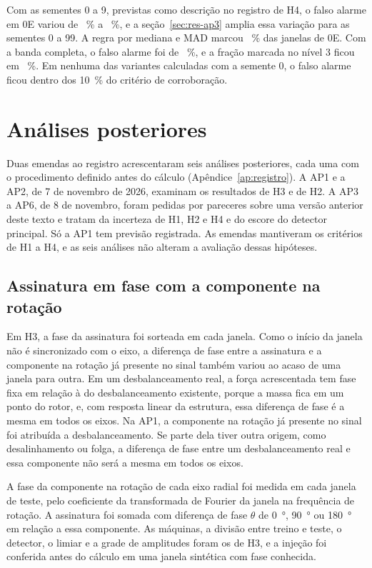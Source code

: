 Com as sementes 0 a 9, previstas como descrição no registro de H4, o falso alarme em 0E variou de \hQuatroFaSementeMin~\% a \hQuatroFaSementeMax~\%, e a seção~\ref{sec:res-ap3} amplia essa variação para as sementes 0 a 99. A regra por mediana e MAD marcou \hQuatroFracaoMadZero~\% das janelas de 0E. Com a banda completa, o falso alarme foi de \hQuatroFracaoBandaCompletaZero~\%, e a fração marcada no nível 3 ficou em \hQuatroFracaoBandaCompletaTres~\%. Em nenhuma das variantes calculadas com a semente 0, o falso alarme ficou dentro dos \SI{10}{\percent} do critério de corroboração.

\section{Análises posteriores}\label{sec:res-posteriores}

Duas emendas ao registro acrescentaram seis análises posteriores, cada uma com o procedimento definido antes do cálculo (Apêndice~\ref{ap:registro}). A AP1 e a AP2, de 7 de novembro de 2026, examinam os resultados de H3 e de H2. A AP3 a AP6, de 8 de novembro, foram pedidas por pareceres sobre uma versão anterior deste texto e tratam da incerteza de H1, H2 e H4 e do escore do detector principal. Só a AP1 tem previsão registrada. As emendas mantiveram os critérios de H1 a H4, e as seis análises não alteram a avaliação dessas hipóteses.

\subsection{Assinatura em fase com a componente na rotação}\label{sec:res-ap1}

Em H3, a fase da assinatura foi sorteada em cada janela. Como o início da janela não é sincronizado com o eixo, a diferença de fase entre a assinatura e a componente na rotação já presente no sinal também variou ao acaso de uma janela para outra. Em um desbalanceamento real, a força acrescentada tem fase fixa em relação à do desbalanceamento existente, porque a massa fica em um ponto do rotor, e, com resposta linear da estrutura, essa diferença de fase é a mesma em todos os eixos. Na AP1, a componente na rotação já presente no sinal foi atribuída a desbalanceamento. Se parte dela tiver outra origem, como desalinhamento ou folga, a diferença de fase entre um desbalanceamento real e essa componente não será a mesma em todos os eixos.

A fase da componente na rotação de cada eixo radial foi medida em cada janela de teste, pelo coeficiente da transformada de Fourier da janela na frequência de rotação. A assinatura foi somada com diferença de fase $\theta$ de \SI{0}{\degree}, \SI{90}{\degree} ou \SI{180}{\degree} em relação a essa componente. As máquinas, a divisão entre treino e teste, o detector, o limiar e a grade de amplitudes foram os de H3, e a injeção foi conferida antes do cálculo em uma janela sintética com fase conhecida.

